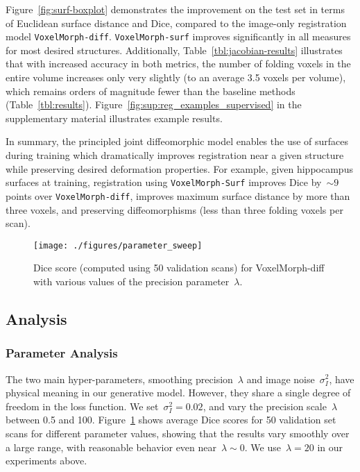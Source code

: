 \documentclass{article}
\begin{document}
	Figure~\ref{fig:surf-boxplot} demonstrates the improvement on the test set in terms of Euclidean surface distance and Dice, compared to the image-only registration model \verb|VoxelMorph-diff|. \verb|VoxelMorph-surf| improves significantly in all measures for most desired structures. Additionally, Table~\ref{tbl:jacobian-results} illustrates that with increased accuracy in both metrics, the number of folding voxels in the entire volume increases only very slightly (to an average 3.5 voxels per volume), which remains orders of magnitude fewer than the baseline methods (Table~\ref{tbl:results}). Figure~\ref{fig:sup:reg_examples_supervised} in the supplementary material illustrates example results.
	
	
	
	In summary, the principled joint diffeomorphic model enables the use of surfaces during training which dramatically improves registration near a given structure while preserving desired deformation properties. For example, given hippocampus surfaces at training, registration using \verb|VoxelMorph-Surf| improves Dice by~$\sim 9$ points over \verb|VoxelMorph-diff|, improves maximum surface distance by more than three voxels, and preserving diffeomorphisms (less than three folding voxels per scan).
	













\begin{figure}[t!]
	\centering
	\texttt{[image: ./figures/parameter\_sweep]}
	\caption{Dice score (computed using 50 validation scans) for VoxelMorph-diff with various values of the precision parameter~$\lambda$.}
	\label{fig:sweep}
\end{figure}










\subsection{Analysis}




\subsubsection{Parameter Analysis} 
The two main hyper-parameters, smoothing precision~$\lambda$ and image noise~$\sigma_I^2$, have physical meaning in our generative model. However, they share a single degree of freedom in the loss function.  We set~$\sigma_I^2 = 0.02$, and vary the precision scale~$\lambda$ between 0.5 and 100. Figure~\ref{fig:sweep} shows average Dice scores for 50 validation set scans for different parameter values, showing that the results vary smoothly over a large range, with reasonable behavior even near~$\lambda\sim 0$. We use~$\lambda=20$ in our experiments above. 
\end{document}

